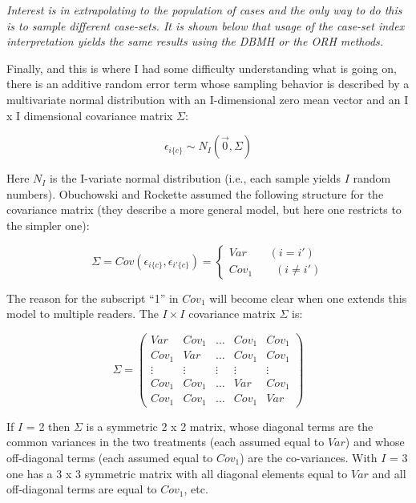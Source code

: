 \documentclass[
]{book}
\begin{document}
\emph{Interest is in extrapolating to the population of cases and the only way to do this is to sample different case-sets. It is shown below that usage of the case-set index interpretation yields the same results using the DBMH or the ORH methods.}

Finally, and this is where I had some difficulty understanding what is going on, there is an additive random error term whose sampling behavior is described by a multivariate normal distribution with an I-dimensional zero mean vector and an I x I dimensional covariance matrix \(\Sigma\):

\begin{equation}
\epsilon_{i\{c\}} \sim N_I\left ( \vec{0} ,  \Sigma\right )
\label{eq:DefinitionEpsilon}
\end{equation}

Here \(N_I\) is the I-variate normal distribution (i.e., each sample yields \(I\) random numbers). Obuchowski and Rockette assumed the following structure for the covariance matrix (they describe a more general model, but here one restricts to the simpler one):

\begin{equation}
\Sigma=Cov\left ( \epsilon_{i\{c\}}, \epsilon_{i'\{c\}} \right )=\left\{\begin{matrix}
Var \qquad (i=i')\\ 
Cov_1 \qquad (i\neq i')
\end{matrix}\right.
\label{eq:DefinitionSigma}
\end{equation}

The reason for the subscript ``1'' in \(Cov_1\) will become clear when one extends this model to multiple readers. The \(I \times I\) covariance matrix \(\Sigma\) is:

\begin{equation}
\Sigma=
\begin{pmatrix}
Var & Cov_1   & \ldots & Cov_1 & Cov_1 \\
Cov_1 & Var   & \ldots &Cov_1 & Cov_1 \\
\vdots & \vdots & \vdots & \vdots & \vdots \\
Cov_1 & Cov_1 & \ldots & Var & Cov_1 \\
Cov_1 & Cov_1 & \ldots & Cov_1 & Var
\end{pmatrix}
\label{eq:ExampleSigma}
\end{equation}

If \(I\) = 2 then \(\Sigma\) is a symmetric 2 x 2 matrix, whose diagonal terms are the common variances in the two treatments (each assumed equal to \(Var\)) and whose off-diagonal terms (each assumed equal to \(Cov_1\)) are the co-variances. With \(I\) = 3 one has a 3 x 3 symmetric matrix with all diagonal elements equal to \(Var\) and all off-diagonal terms are equal to \(Cov_1\), etc.
\end{document}
